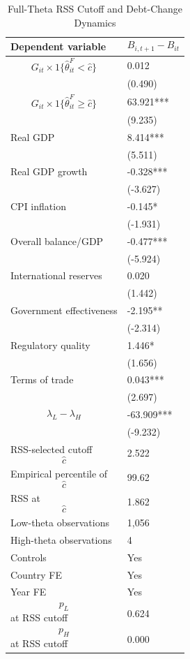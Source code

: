 \begin{table}[H]\centering
\begin{threeparttable}
\caption{Full-Theta RSS Cutoff and Debt-Change Dynamics}
\label{tab:deltaB_rss_cutoff_fulltheta}
\scriptsize
\begin{tabularx}{\textwidth}{lY}
\toprule
Dependent variable & $$B_{i,t+1}-B_{it}$$ \\
\midrule
$$G_{it}\times 1\{\widehat{\theta}^{F}_{it}<\widehat{c}\}$$ & 0.012 \\
 & (0.490) \\
$$G_{it}\times 1\{\widehat{\theta}^{F}_{it}\geq\widehat{c}\}$$ & 63.921*** \\
 & (9.235) \\
Real GDP & 8.414*** \\
 & (5.511) \\
Real GDP growth & -0.328*** \\
 & (-3.627) \\
CPI inflation & -0.145* \\
 & (-1.931) \\
Overall balance/GDP & -0.477*** \\
 & (-5.924) \\
International reserves & 0.020 \\
 & (1.442) \\
Government effectiveness & -2.195** \\
 & (-2.314) \\
Regulatory quality & 1.446* \\
 & (1.656) \\
Terms of trade & 0.043*** \\
 & (2.697) \\
$$\lambda_L-\lambda_H$$ & -63.909*** \\
 & (-9.232) \\
\midrule
RSS-selected cutoff $$\widehat{c}$$ & 2.522 \\
Empirical percentile of $$\widehat{c}$$ & 99.62 \\
RSS at $$\widehat{c}$$ & 1.862 \\
Low-theta observations & 1,056 \\
High-theta observations & 4 \\
Controls & Yes \\
Country FE & Yes \\
Year FE & Yes \\
$$p_L$$ at RSS cutoff & 0.624 \\
$$p_H$$ at RSS cutoff & 0.000 \\

\end{tabularx}
\end{threeparttable}
\end{table}
